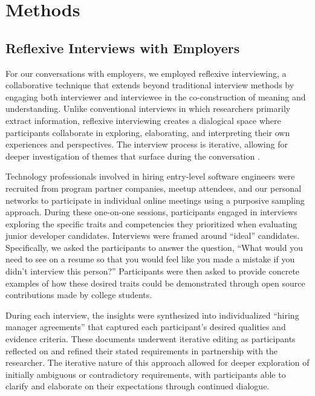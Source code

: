 \section{Methods}

\subsection{Reflexive Interviews with Employers}

For our conversations with employers, we employed reflexive interviewing, a collaborative technique that extends beyond traditional interview methods by engaging both interviewer and interviewee in the co-construction of meaning and understanding. Unlike conventional interviews in which researchers primarily extract information, reflexive interviewing creates a dialogical space where participants collaborate in exploring, elaborating, and interpreting their own experiences and perspectives. The interview process is iterative, allowing for deeper investigation of themes that surface during the conversation \citep{pessoaUsingReflexiveInterviewing2019}.

Technology professionals involved in hiring entry-level software engineers were recruited from program partner companies, meetup attendees, and our personal networks to participate in individual online meetings using a purposive sampling approach. During these one-on-one sessions, participants engaged in interviews exploring the specific traits and competencies they prioritized when evaluating junior developer candidates. Interviews were framed around ``ideal'' candidates. Specifically, we asked the participants to answer the question, ``What would you need to see on a resume so that you would feel like you made a mistake if you didn't interview this person?'' Participants were then asked to provide concrete examples of how these desired traits could be demonstrated through open source contributions made by college students.

During each interview, the insights were synthesized into individualized ``hiring manager agreements'' that captured each participant's desired qualities and evidence criteria. These documents underwent iterative editing as participants reflected on and refined their stated requirements in partnership with the researcher. The iterative nature of this approach allowed for deeper exploration of initially ambiguous or contradictory requirements, with participants able to clarify and elaborate on their expectations through continued dialogue.

